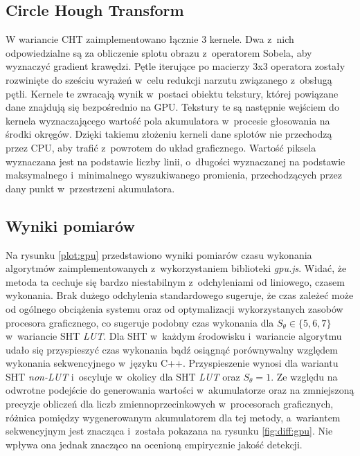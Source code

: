 \subsection{Circle Hough Transform}
\label{sec:cht-gpu}

W wariancie CHT zaimplementowano łącznie 3 kernele. Dwa z~nich odpowiedzialne są za obliczenie splotu obrazu z~operatorem Sobela, aby wyznaczyć gradient krawędzi. Pętle iterujące po macierzy 3x3 operatora zostały rozwinięte do sześciu wyrażeń w~celu redukcji narzutu związanego z~obsługą pętli. Kernele te zwracają wynik w~postaci obiektu tekstury, której powiązane dane znajdują się bezpośrednio na GPU. Tekstury te są następnie wejściem do kernela wyznaczającego wartość pola akumulatora w~procesie głosowania na środki okręgów. Dzięki takiemu złożeniu kerneli dane splotów nie przechodzą przez CPU, aby trafić z~powrotem do układ graficznego. Wartość piksela wyznaczana jest na podstawie liczby linii, o~długości wyznaczanej na podstawie maksymalnego i~minimalnego wyszukiwanego promienia, przechodzących przez dany punkt w~przestrzeni akumulatora.

\subsection{Wyniki pomiarów}

Na rysunku \ref{plot:gpu} przedstawiono wyniki pomiarów czasu wykonania algorytmów zaimplementowanych z~wykorzystaniem biblioteki \textit{gpu.js}. Widać, że metoda ta cechuje się bardzo niestabilnym z~odchyleniami od liniowego, czasem wykonania. Brak dużego odchylenia standardowego sugeruje, że czas zależeć może od ogólnego obciążenia systemu oraz od optymalizacji wykorzystanych zasobów procesora graficznego, co sugeruje podobny czas wykonania dla $S_\theta \in \{5,6,7\}$ w~wariancie SHT \textit{LUT}. Dla SHT w~każdym środowisku i~wariancie algorytmu udało się przyspieszyć czas wykonania bądź osiągnąć porównywalny względem wykonania sekwencyjnego w~języku C++. Przyspieszenie wynosi  dla wariantu SHT \textit{non-LUT} i~oscyluje w~okolicy  dla SHT \textit{LUT} oraz $S_\theta = 1$. Ze względu na odwrotne podejście do generowania wartości w~akumulatorze oraz na zmniejszoną precyzje obliczeń dla liczb zmiennoprzecinkowych w~procesorach graficznych, różnica pomiędzy wygenerowanym akumulatorem dla tej metody, a~wariantem sekwencyjnym jest znacząca i~została pokazana na rysunku \ref{fig:diff:gpu}. Nie wpływa ona jednak znacząco na ocenioną empirycznie jakość detekcji. 

